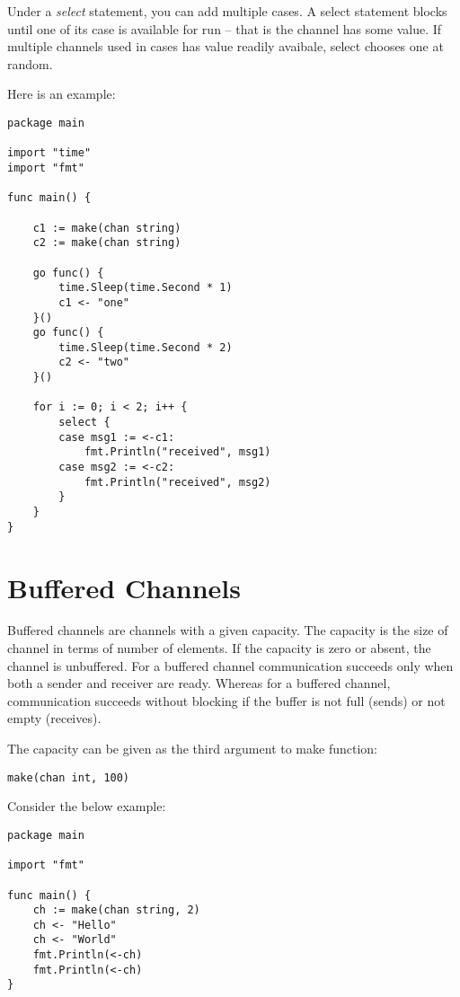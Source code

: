 Under a \emph{select} statement, you can add multiple cases.  A select
statement blocks until one of its case is available for run -- that is
the channel has some value.  If multiple channels used in cases has
value readily avaibale, select chooses one at random.

Here is an example:

\begin{lstlisting}[numbers=none]
package main

import "time"
import "fmt"

func main() {

    c1 := make(chan string)
    c2 := make(chan string)

    go func() {
        time.Sleep(time.Second * 1)
        c1 <- "one"
    }()
    go func() {
        time.Sleep(time.Second * 2)
        c2 <- "two"
    }()

    for i := 0; i < 2; i++ {
        select {
        case msg1 := <-c1:
            fmt.Println("received", msg1)
        case msg2 := <-c2:
            fmt.Println("received", msg2)
        }
    }
}
\end{lstlisting}


\section{Buffered Channels}

Buffered channels are channels with a given
capacity.  The capacity is the size of channel in terms of number of
elements.  If the capacity is zero or absent, the channel is
unbuffered.  For a buffered channel communication succeeds only when
both a sender and receiver are ready.  Whereas for a buffered channel,
communication succeeds without blocking if the buffer is not full
(sends) or not empty (receives).

The capacity can be given as the third argument to make function:

\begin{lstlisting}[numbers=none]
make(chan int, 100)
\end{lstlisting}

Consider the below example:

\begin{lstlisting}
package main

import "fmt"

func main() {
    ch := make(chan string, 2)
    ch <- "Hello"
    ch <- "World"
    fmt.Println(<-ch)
    fmt.Println(<-ch)
}
\end{lstlisting}

